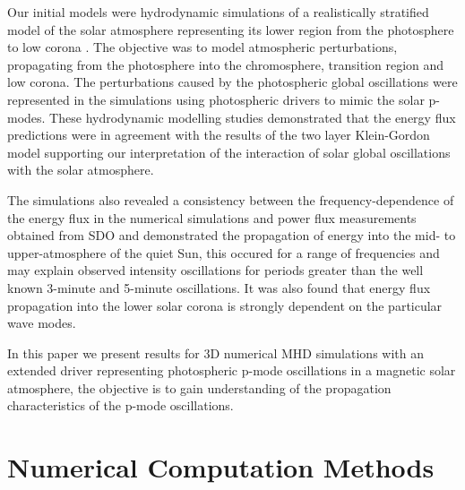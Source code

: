 \documentclass[twocolumn]{aastex62}
\begin{document}
Our initial models were hydrodynamic simulations of a realistically stratified model of the solar atmosphere representing its lower region from the photosphere to low corona \citet{Griffiths2018}. The objective was to model atmospheric perturbations, propagating from the photosphere into the chromosphere, transition region and low corona. The perturbations caused by the photospheric global oscillations were represented in the simulations using photospheric drivers to mimic the solar p-modes. These hydrodynamic modelling studies demonstrated that the energy flux predictions were in agreement with the results of the two layer Klein-Gordon model supporting our interpretation of the interaction of solar global oscillations with the solar atmosphere.

The simulations also revealed a consistency between the frequency-dependence of the energy flux in the numerical simulations and power flux measurements obtained from SDO and demonstrated the propagation of energy into the mid- to upper-atmosphere of the quiet Sun, this occured for a range of frequencies and may explain observed intensity oscillations for periods greater than the well known 3-minute and 5-minute oscillations. It was also found that energy flux propagation into the lower solar corona is strongly dependent on the particular wave modes. 

In this paper we present results for 3D numerical MHD simulations with an extended driver representing photospheric p-mode oscillations in a magnetic solar atmosphere, the objective is to gain understanding of the propagation characteristics of the p-mode oscillations. 

\section{Numerical Computation Methods}
\end{document}
